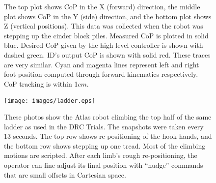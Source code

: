 \documentclass{ws-ijhr}
\begin{document}
\begin{figure}
  \begin{center}
    \caption{The top plot shows CoP in the X (forward) direction, the middle plot 
      shows CoP in the Y (side) direction, and the bottom plot shows
      Z (vertical positions). This data was collected when the robot was 
      stepping up the cinder block piles. Measured CoP is plotted in solid blue.
      Desired CoP given by the high level controller is shown with dashed green. ID's 
      output CoP is shown with solid red. These traces are very similar.
      Cyan and magenta lines represent 
      left and right foot position computed through forward kinematics 
      respectively. CoP tracking is within 1$cm$. }

    \label{fig:walk_cop} 
  \end{center}
\end{figure}    

\begin{figure}
  \begin{center}
    {\texttt{[image: images/ladder.eps]}}
    \caption{
      These photos show the Atlas robot climbing the top half of the same 
      ladder as used in the DRC Trials. The snapshots were taken every 13 seconds. The
      top row shows re-positioning of the hook hands, and the bottom row shows
      stepping up one tread. Most of the climbing motions are scripted. After
      each limb's rough re-positioning, the operator can fine adjust its final 
      position with ``nudge'' commands that are small offsets in Cartesian 
      space. 
      }\label{fig:ladder_pic} 
  \end{center}
\end{figure}    
\end{document}
